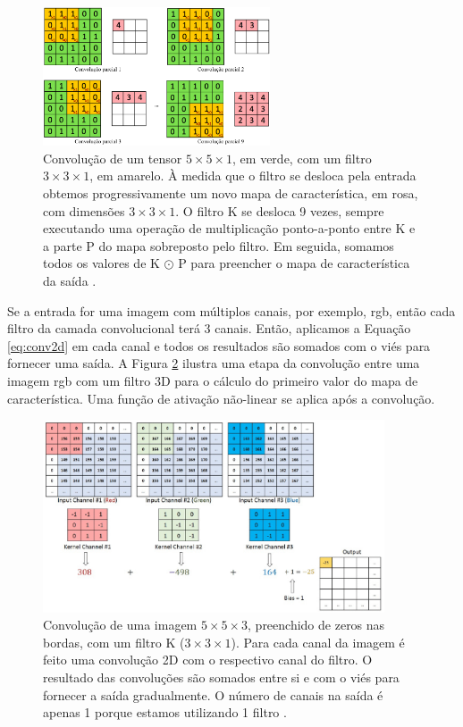 \begin{figure}[h]
	\centering
	\includegraphics[width=0.6\textwidth]{figuras/conv2D.pdf}
	\caption[Convolução 2D em um mapa de recurso.]{Convolução de um tensor $5 \times 5 \times 1$, em verde, com um filtro $3 \times 3 \times 1$, em amarelo. À medida que o filtro se desloca pela entrada obtemos progressivamente um novo mapa de característica, em rosa, com dimensões $3 \times 3 \times 1$.  O filtro K se desloca 9 vezes, sempre executando uma operação de multiplicação ponto-a-ponto entre K e a parte P do mapa sobreposto pelo filtro. Em seguida, somamos todos os valores de K $\odot$ P para preencher o mapa de característica da saída \cite{sumit}.}
	\label{fig:con2d}
\end{figure}

Se a entrada for uma imagem com múltiplos canais, por exemplo, \acrshort{rgb}, então cada filtro da camada convolucional terá 3 canais.  Então, aplicamos a Equação \ref{eq:conv2d} em cada canal e todos os resultados são somados com o viés para fornecer uma saída. A Figura \ref{fig:con3d} ilustra uma etapa da convolução entre uma imagem \acrshort{rgb} com um filtro 3D para o cálculo do primeiro valor do mapa de característica. Uma função de ativação não-linear se aplica após a convolução.

\begin{figure}[h]
	\centering
	\includegraphics[width=0.9\textwidth]{figuras/conv3D.pdf}
	\caption[Convolução 2D em três mapas de recursos.]{Convolução de uma imagem  $5 \times 5 \times 3$, preenchido de zeros nas bordas, com um filtro K ($3 \times 3 \times 1$). Para cada canal da imagem é feito uma convolução 2D com o respectivo canal do filtro. O resultado das convoluções são somados entre si e com o viés para fornecer a saída gradualmente.  O número de canais na saída é apenas 1 porque estamos utilizando 1 filtro \cite{sumit}.}
	\label{fig:con3d}
\end{figure}


